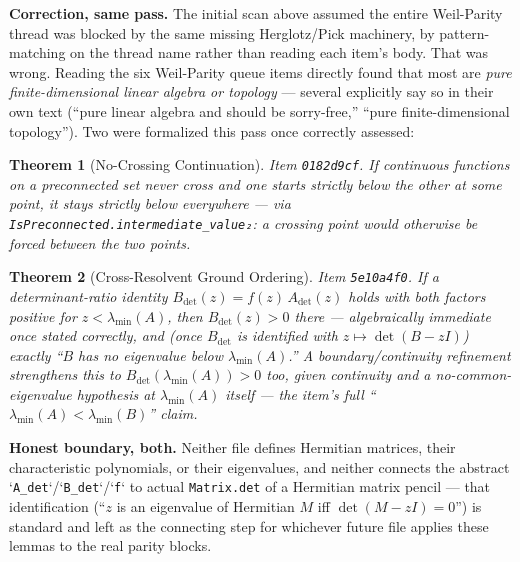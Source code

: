 \documentclass{report}
\newtheorem{theorem}{Theorem}[chapter]
\theoremstyle{definition}
\begin{document}
\textbf{Correction, same pass.} The initial scan above assumed the entire Weil-Parity
thread was blocked by the same missing Herglotz/Pick machinery, by pattern-matching on the
thread name rather than reading each item's body. That was wrong. Reading the six
Weil-Parity queue items directly found that most are \emph{pure finite-dimensional linear
algebra or topology} --- several explicitly say so in their own text (``pure linear
algebra and should be sorry-free,'' ``pure finite-dimensional topology''). Two were
formalized this pass once correctly assessed:

\begin{theorem}[No-Crossing Continuation]
  \label{thm:weilparity-ground-continuation}
  \leanok
  Item \texttt{0182d9cf}. If continuous functions on a preconnected set never cross and one
  starts strictly below the other at some point, it stays strictly below everywhere ---
  via \texttt{IsPreconnected.intermediate\_value₂}: a crossing point would otherwise be
  forced between the two points.
\end{theorem}

\begin{theorem}[Cross-Resolvent Ground Ordering]
  \label{thm:weilparity-cross-resolvent-ordering}
  \leanok
  Item \texttt{5e10a4f0}. If a determinant-ratio identity $B_{\det}(z)=f(z)\,A_{\det}(z)$
  holds with both factors positive for $z<\lambda_{\min}(A)$, then $B_{\det}(z)>0$ there ---
  algebraically immediate once stated correctly, and (once $B_{\det}$ is identified with
  $z\mapsto\det(B-zI)$) exactly ``$B$ has no eigenvalue below $\lambda_{\min}(A)$.'' A
  boundary/continuity refinement strengthens this to $B_{\det}(\lambda_{\min}(A))>0$ too,
  given continuity and a no-common-eigenvalue hypothesis at $\lambda_{\min}(A)$ itself ---
  the item's full ``$\lambda_{\min}(A)<\lambda_{\min}(B)$'' claim.
\end{theorem}

\textbf{Honest boundary, both.} Neither file defines Hermitian matrices, their
characteristic polynomials, or their eigenvalues, and neither connects the abstract
`\texttt{A\_det}`/`\texttt{B\_det}`/`\texttt{f}` to actual \texttt{Matrix.det} of a
Hermitian matrix pencil --- that identification (``$z$ is an eigenvalue of Hermitian $M$
iff $\det(M-zI)=0$'') is standard and left as the connecting step for whichever future
file applies these lemmas to the real parity blocks.
\end{document}
